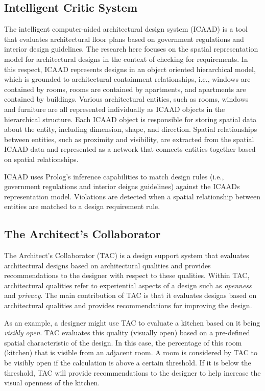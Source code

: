 \documentclass[12pt]{ucthesis}
\begin{document}
\subsection{Intelligent Critic System}
The intelligent computer-aided architectural design system (ICAAD) \cite{IntelligentCritic} is a tool that evaluates architectural floor plans based on government regulations and interior design guidelines. The research here focuses on the spatial representation model for architectural designs in the context of checking for requirements. In this respect, ICAAD represents designs in an object oriented hierarchical model, which is grounded to architectural containment relationships, i.e., windows are contained by rooms, rooms are contained by apartments, and apartments are contained by buildings. Various architectural entities, such as rooms, windows and furniture are all represented individually as ICAAD objects in the hierarchical structure. Each ICAAD object is responsible for storing spatial data about the entity, including dimension, shape, and direction. Spatial relationships between entities, such as proximity and visibility, are extracted from the spatial ICAAD data and represented as a network that connects entities together based on spatial relationships. 

ICAAD uses Prolog's inference capabilities to match design rules (i.e., government regulations and interior deigns guidelines) against the ICAADs representation model. Violations are detected when a spatial relationship between entities are matched to a design requirement rule.


\subsection{The Architect's Collaborator}
The Architect's Collaborator (TAC) \cite{KoileTAC} is a design support system that evaluates architectural designs based on architectural qualities and provides recommendations to the designer with respect to these qualities. Within TAC, architectural qualities refer to experiential aspects of a design such as \emph{openness} and \emph{privacy}. The main contribution of TAC is that it evaluates designs based on architectural qualities and provides recommendations for improving the design.


As an example, a designer might use TAC to evaluate a kitchen based on it being \emph{visibly open}. TAC evaluates this quality (visually open) based on a pre-defined spatial characteristic of the design. In this case, the percentage of this room (kitchen) that is visible from an adjacent room. A room is considered by TAC to be visibly open if the calculation is above a certain threshold. If it is below the threshold, TAC will provide recommendations to the designer to help increase the visual openness of the kitchen. 
\end{document}

